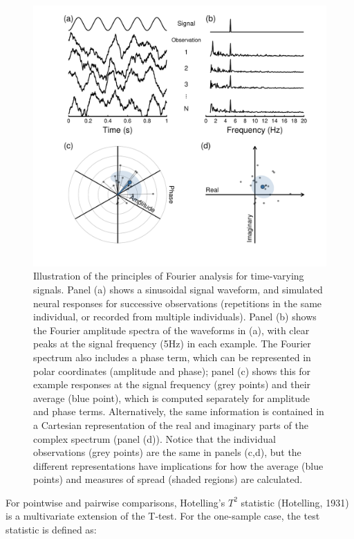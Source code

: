 \documentclass[]{article}
\begin{document}
\begin{figure}

{\centering \includegraphics{figures/fourierexplain} 

}

\caption{Illustration of the principles of Fourier analysis for time-varying signals. Panel (a) shows a sinusoidal signal waveform, and simulated neural responses for successive observations (repetitions in the same individual, or recorded from multiple individuals). Panel (b) shows the Fourier amplitude spectra of the waveforms in (a), with clear peaks at the signal frequency (5Hz) in each example. The Fourier spectrum also includes a phase term, which can be represented in polar coordinates (amplitude and phase); panel (c) shows this for example responses at the signal frequency (grey points) and their average (blue point), which is computed separately for amplitude and phase terms. Alternatively, the same information is contained in a Cartesian representation of the real and imaginary parts of the complex spectrum (panel (d)). Notice that the individual observations (grey points) are the same in panels (c,d), but the different representations have implications for how the average (blue points) and measures of spread (shaded regions) are calculated.}\label{fig:fourierexplain}
\end{figure}

For pointwise and pairwise comparisons, Hotelling's \(T^2\) statistic (Hotelling, 1931) is a multivariate extension of the T-test. For the one-sample case, the test statistic is defined as:
\end{document}
